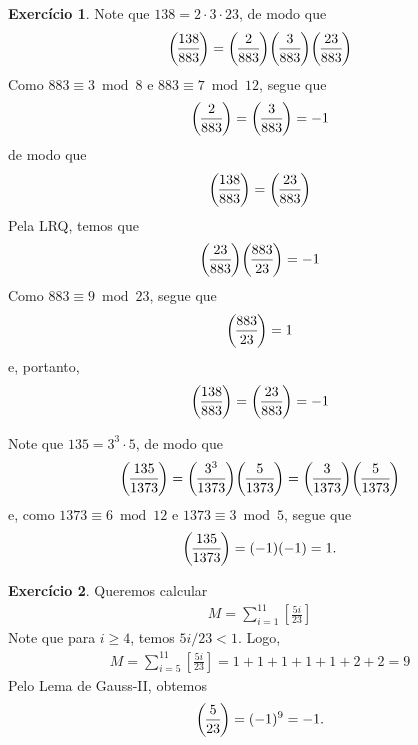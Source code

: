 \documentclass[a4paper,12pt]{article}
\theoremstyle{definition}
\newtheorem{exercise}{Exercício}%
\newcommand{\genlegendre}[4]{%
	\genfrac{(}{)}{}{#1}{#3}{#4}%
	\if\relax\detokenize{#2}\relax\else_{\!#2}\fi
}
\newcommand{\legendre}[3][]{\genlegendre{}{#1}{#2}{#3}}
\begin{document}
	\begin{exercise}
		Note que $138 = 2\cdot 3\cdot 23$, de modo que
		\begin{align*}
		\legendre[]{138}{883} = \legendre[]{2}{883}\legendre[]{3}{883}\legendre[]{23}{883}
		\end{align*}
		Como $883\equiv 3\bmod 8$ e $883\equiv 7\bmod 12$, segue que
		\begin{align*}
		\legendre[]{2}{883} = \legendre[]{3}{883} = -1
		\end{align*}
		de modo que
		\begin{align*}
		\legendre[]{138}{883} = \legendre[]{23}{883}
		\end{align*}
		Pela LRQ, temos que
		\begin{align*}
		\legendre[]{23}{883}\legendre[]{883}{23} = -1
		\end{align*}
		Como $883\equiv 9\bmod 23$, segue que
		\begin{align*}
		\legendre[]{883}{23} = 1
		\end{align*}
		e, portanto,
		\begin{align*}
		\legendre[]{138}{883} = \legendre[]{23}{883} = -1
		\end{align*}
		\par\vspace{0.3cm} Note que $135 = 3^3\cdot 5$, de modo que
		\begin{align*}
		\legendre[]{135}{1373} = \legendre[]{3^3}{1373}\legendre[]{5}{1373} = \legendre[]{3}{1373}\legendre[]{5}{1373}
		\end{align*}
		e, como $1373\equiv 6\bmod 12$ e $1373\equiv 3\bmod 5$, segue que
		\begin{align*}
		\legendre[]{135}{1373} = (-1)(-1) = 1.
		\end{align*}
	\end{exercise}

	\begin{exercise}
		Queremos calcular
		\begin{align*}
		M = \sum_{i=1}^{11}\left[ \frac{5i}{23} \right]
		\end{align*}
		Note que para $i\geq 4$, temos $5i/23<1$. Logo,
		\begin{align*}
		M = \sum_{i=5}^{11}\left[ \frac{5i}{23} \right] = 1+1+1+1+1+2+2 = 9
		\end{align*}
		Pelo Lema de Gauss-II, obtemos
		\begin{align*}
		\legendre[]{5}{23} = (-1)^9 = -1.
		\end{align*}
	\end{exercise}
\end{document}
